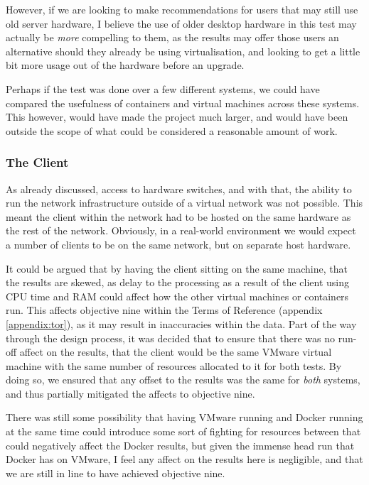 However, if we are looking to make recommendations for users that may still use old server hardware, I believe the use of older desktop hardware in this test may actually be \emph{more} compelling to them, as the results may offer those users an alternative should they already be using virtualisation, and looking to get a little bit more usage out of the hardware before an upgrade.

Perhaps if the test was done over a few different systems, we could have compared the usefulness of containers and virtual machines across these systems. This however, would have made the project much larger, and would have been outside the scope of what could be considered a reasonable amount of work.

\subsubsection{The Client}
\label{ClientHardwareLimitation}
As already discussed, access to hardware switches, and with that, the ability to run the network infrastructure outside of a virtual network was not possible. This meant the client within the network had to be hosted on the same hardware as the rest of the network. Obviously, in a real-world environment we would expect a number of clients to be on the same network, but on separate host hardware.

It could be argued that by having the client sitting on the same machine, that the results are skewed, as delay to the processing as a result of the client using CPU time and RAM could affect how the other virtual machines or containers run. This affects objective nine within the Terms of Reference (appendix \ref{appendix:tor}), as it may result in inaccuracies within the data. Part of the way through the design process, it was decided that to ensure that there was no run-off affect on the results, that the client would be the same VMware virtual machine with the same number of resources allocated to it for both tests. By doing so, we ensured that any offset to the results was the same for \emph{both} systems, and thus partially mitigated the affects to objective nine.

There was still some possibility that having VMware running and Docker running at the same time could introduce some sort of fighting for resources between that could negatively affect the Docker results, but given the immense head run that Docker has on VMware, I feel any affect on the results here is negligible, and that we are still in line to have achieved objective nine.

